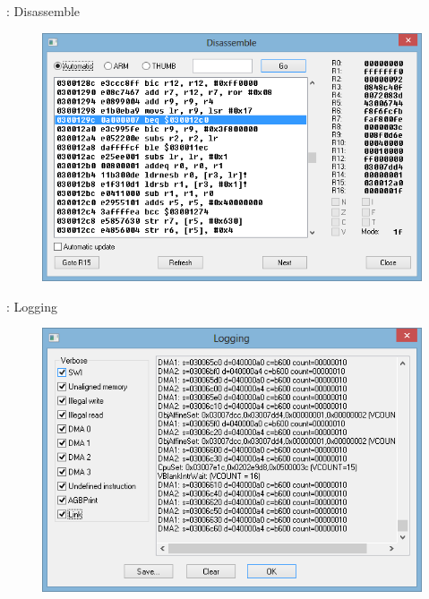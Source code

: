 \documentclass{beamer}
\begin{document}
\begin{darkframes}
\begin{frame}{\subsecname: Disassemble}
    \begin{figure}
        \centering
        \includegraphics[width=1\textwidth,height=0.5\textheight,keepaspectratio]{disassemble}
    \end{figure}
\end{frame}

\begin{frame}{\subsecname: Logging}
    \begin{figure}
        \centering
        \includegraphics[width=1\textwidth,height=0.5\textheight,keepaspectratio]{loggingview}
    \end{figure}
\end{frame}


\end{darkframes}
\end{document}
